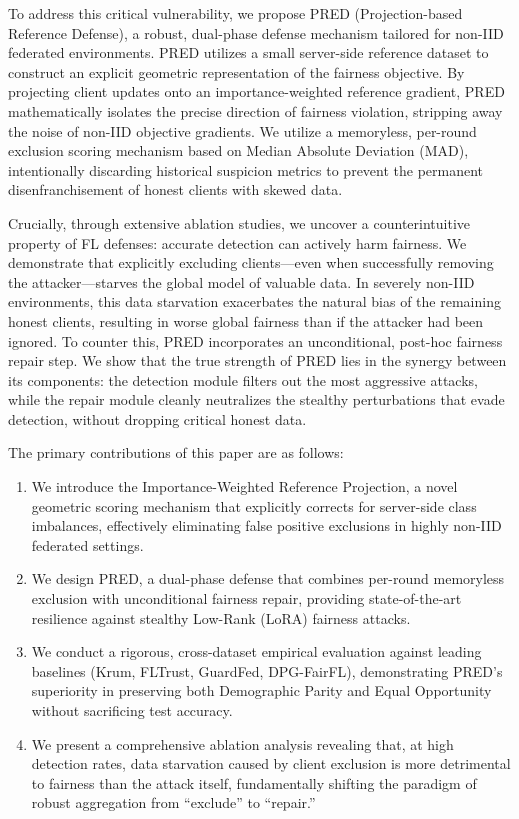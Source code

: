 \documentclass[journal]{IEEEtran}
\begin{document}
To address this critical vulnerability, we propose PRED (Projection-based Reference Defense), a robust, dual-phase defense mechanism tailored for non-IID federated environments. PRED utilizes a small server-side reference dataset to construct an explicit geometric representation of the fairness objective. By projecting client updates onto an importance-weighted reference gradient, PRED mathematically isolates the precise direction of fairness violation, stripping away the noise of non-IID objective gradients. We utilize a memoryless, per-round exclusion scoring mechanism based on Median Absolute Deviation (MAD), intentionally discarding historical suspicion metrics to prevent the permanent disenfranchisement of honest clients with skewed data.

Crucially, through extensive ablation studies, we uncover a counterintuitive property of FL defenses: accurate detection can actively harm fairness. We demonstrate that explicitly excluding clients—even when successfully removing the attacker—starves the global model of valuable data. In severely non-IID environments, this data starvation exacerbates the natural bias of the remaining honest clients, resulting in worse global fairness than if the attacker had been ignored. To counter this, PRED incorporates an unconditional, post-hoc fairness repair step. We show that the true strength of PRED lies in the synergy between its components: the detection module filters out the most aggressive attacks, while the repair module cleanly neutralizes the stealthy perturbations that evade detection, without dropping critical honest data.

The primary contributions of this paper are as follows:
\begin{enumerate}
    \item We introduce the Importance-Weighted Reference Projection, a novel geometric scoring mechanism that explicitly corrects for server-side class imbalances, effectively eliminating false positive exclusions in highly non-IID federated settings.
    \item We design PRED, a dual-phase defense that combines per-round memoryless exclusion with unconditional fairness repair, providing state-of-the-art resilience against stealthy Low-Rank (LoRA) fairness attacks.
    \item We conduct a rigorous, cross-dataset empirical evaluation against leading baselines (Krum, FLTrust, GuardFed, DPG-FairFL), demonstrating PRED's superiority in preserving both Demographic Parity and Equal Opportunity without sacrificing test accuracy.
    \item We present a comprehensive ablation analysis revealing that, at high detection rates, data starvation caused by client exclusion is more detrimental to fairness than the attack itself, fundamentally shifting the paradigm of robust aggregation from ``exclude'' to ``repair.''
\end{enumerate}
\end{document}
